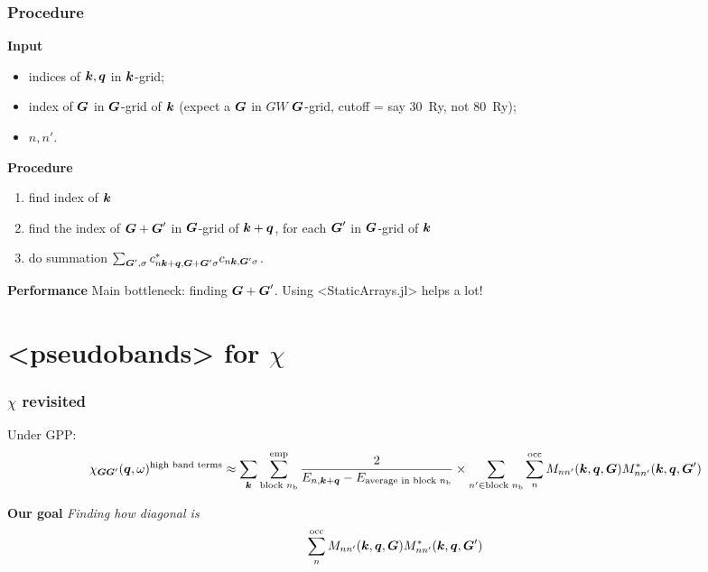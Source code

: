 \documentclass[t]{beamer}
\newcommand{\shortcode}[1]{\texttt{#1}}
\def\\{}%
\def\texttt#1{<#1>}%
\begin{document}
\begin{frame}
\frametitle{Procedure}

\textbf{Input} 
\begin{itemize}
    \item indices of $\vb*{k}, \vb*{q}$ in $\vb*{k}$-grid; 
    \item index of $\vb*{G}$ in $\vb*{G}$-grid of $\vb*{k}$ 
    (expect a $\vb*{G}$ in $GW$ $\vb*{G}$-grid, 
    cutoff = say \SI{30}{Ry}, not \SI{80}{Ry});
    \item $n, n'$.
\end{itemize}

\textbf{Procedure}
\begin{enumerate}
    \item find index of $\vb*{k}$
    \item find the index of $\vb*{G} + \vb*{G}'$ in $\vb*{G}$-grid of $\vb*{k} + \vb*{q}$,
    for each $\vb*{G}'$ in $\vb*{G}$-grid of $\vb*{k}$
    \item do summation $\sum_{\vb*{G}', \sigma} c^*_{n \vb*{k} + \vb*{q}, \vb*{G} + \vb*{G}' \sigma} c_{n \vb*{k}, \vb*{G}' \sigma}$.
\end{enumerate}    

\vspace{0.5cm}

\textbf{Performance} Main bottleneck: finding $\vb*{G} + \vb*{G}'$.
Using \shortcode{StaticArrays.jl} helps a lot! 

\end{frame}

\section{\shortcode{pseudobands} for $\chi$}

\begin{frame}
\frametitle{$\chi$ revisited}

Under GPP:
\begin{equation}
    \begin{aligned}
        \chi_{\vb*{G} \vb*{G}'}(\vb*{q}, \omega)^{\text{high band terms}}
        \approx \sum_{\vb*{k}} \sum_{\text{block $n_{\text{b}}$}}^{\text{emp}} 
        \frac{
            2
        }{
            E_{n, \vb*{k} + \vb*{q}} - E_{\text{average in block $n_{\text{b}}$}} 
        } \\
        \times \sum_{n' \in \text{block $n_{\text{b}}$}} \sum_{n}^{\text{occ}} 
        M_{n n'} (\vb*{k}, \vb*{q}, \vb*{G}) M^*_{nn'} (\vb*{k}, \vb*{q}, \vb*{G}') 
    \end{aligned}
\end{equation}

\vspace{0.5cm}

\textbf{Our goal} \emph{Finding how diagonal is}
\begin{equation}
    \sum_{n}^{\text{occ}} 
        M_{n n'} (\vb*{k}, \vb*{q}, \vb*{G}) M^*_{nn'} (\vb*{k}, \vb*{q}, \vb*{G}') 
\end{equation}

\end{frame}
\end{document}
